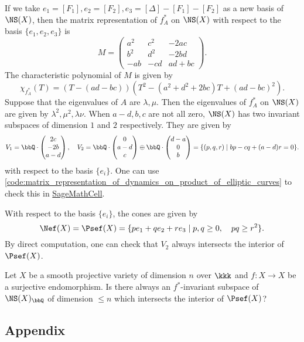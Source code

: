\begin{example}
        If we take \(e_1= [F_1],e_2=[F_2],e_3=[\Delta]-[F_1]-[F_2]\) as a new basis of \(\NS(X)\), then the matrix representation of \(f_A^*\) on \(\NS(X)\) with respect to the basis \(\{e_1,e_2,e_3\}\) is
        \[
            M = \begin{pmatrix}
                a^2 & c^2 & -2ac \\
                b^2 & d^2 & -2bd \\
                -ab & -cd & ad+bc
            \end{pmatrix}.
        \]
        The characteristic polynomial of \(M\) is given by
        \[ \chi_{f_A^*}(T) = (T - (ad-bc))(T^2 - (a^2+d^2+2bc)T + (ad-bc)^2). \]
        Suppose that the eigenvalues of \(A\) are \(\lambda, \mu\).
        Then the eigenvalues of \(f_A^*\) on \(\NS(X)\) are given by \(\lambda^2, \mu^2, \lambda \nu\).
        When \(a-d,b,c\) are not all zero, \(\NS(X)\) has two invariant subspaces of dimension \(1\) and \(2\) respectively.
        They are given by 
        \[ V_1 = \bbQ \cdot \begin{pmatrix}
            2c \\
            -2b \\
            a-d
        \end{pmatrix}, \quad V_2 = \bbQ \cdot \begin{pmatrix}
            0 \\
            a-d \\
            c
        \end{pmatrix} \oplus \bbQ \cdot \begin{pmatrix}
            d-a \\
            0 \\
            b
        \end{pmatrix} = \{(p,q,r) \mid bp-cq+(a-d)r=0\}. \]
        with respect to the basis \(\{e_i\}\).
        One can use \cref{code:matrix_representation_of_dynamics_on_product_of_elliptic_curves} to check this in \href{https://sagecell.sagemath.org/}{SageMathCell}.

        With respect to the basis \(\{e_i\}\), the cones are given by
        \[ \Nef(X) = \Psef(X) = \{p e_1 + q e_2 + r e_3 \mid p,q \geq 0, \quad pq \geq r^2\}. \]
        By direct computation, one can check that \(V_2\) always intersects the interior of \(\Psef(X)\).

        \begin{question}
            Let \(X\) be a smooth projective variety of dimension \(n\) over \(\kkk\) and \(f: X \to X\) be a surjective endomorphism.
            Is there always an \(f^*\)-invariant subspace of \(\NS(X)_\bbQ\) of dimension \(\leq n\) which intersects the interior of \(\Psef(X)\)?
        \end{question}
    \end{example}
    

    \subsection{Appendix}
        
        

